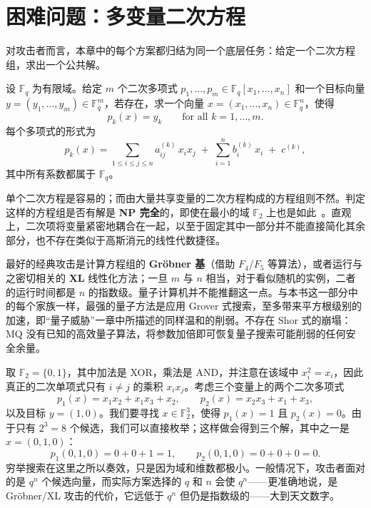 \section{困难问题：多变量二次方程}

对攻击者而言，本章中的每个方案都归结为同一个底层任务：给定一个二次方程组，求出一个公共解。

\begin{definition}[多变量二次（MQ）问题]
设 $\mathbb{F}_q$ 为有限域。给定 $m$ 个二次多项式 $p_1,\dots,p_m \in \mathbb{F}_q[x_1,\dots,x_n]$ 和一个目标向量 $y = (y_1,\dots,y_m) \in \mathbb{F}_q^m$，若存在，求一个向量 $x = (x_1,\dots,x_n) \in \mathbb{F}_q^n$，使得
\[
p_k(x) = y_k \qquad \text{for all } k = 1,\dots,m .
\]
每个多项式的形式为
\[
p_k(x) = \sum_{1 \le i \le j \le n} a^{(k)}_{ij}\, x_i x_j \;+\; \sum_{i=1}^{n} b^{(k)}_i\, x_i \;+\; c^{(k)} ,
\]
其中所有系数都属于 $\mathbb{F}_q$。
\end{definition}

单个二次方程是容易的；而由大量共享变量的二次方程构成的方程组则不然。判定这样的方程组是否有解是 \textbf{NP 完全}的，即使在最小的域 $\mathbb{F}_2$ 上也是如此~\cite{ding2006}。直观上，二次项将变量紧密地耦合在一起，以至于固定其中一部分并不能直接简化其余部分，也不存在类似于高斯消元的线性代数捷径。

最好的经典攻击是计算方程组的 \textbf{Gr\"obner 基}（借助 $F_4$/$F_5$ 等算法），或者运行与之密切相关的 \textbf{XL} 线性化方法；一旦 $m$ 与 $n$ 相当，对于看似随机的实例，二者的运行时间都是 $n$ 的指数级。量子计算机并不能推翻这一点。与本书这一部分中的每个家族一样，最强的量子方法是应用 Grover 式搜索，至多带来平方根级别的加速，即“量子威胁”一章中所描述的同样温和的削弱。不存在 Shor 式的崩塌：MQ 没有已知的高效量子算法，将参数加倍即可恢复量子搜索可能削弱的任何安全余量。

\begin{example}
取 $\mathbb{F}_2 = \{0,1\}$，其中加法是 XOR，乘法是 AND，并注意在该域中 $x_i^2 = x_i$，因此真正的二次单项式只有 $i \neq j$ 的乘积 $x_i x_j$。考虑三个变量上的两个二次多项式
\[
p_1(x) = x_1 x_2 + x_1 x_3 + x_2 , \qquad
p_2(x) = x_2 x_3 + x_1 + x_3 ,
\]
以及目标 $y = (1,0)$。我们要寻找 $x \in \mathbb{F}_2^3$，使得 $p_1(x) = 1$ 且 $p_2(x) = 0$。由于只有 $2^3 = 8$ 个候选，我们可以直接枚举；这样做会得到三个解，其中之一是 $x = (0,1,0)$：
\[
p_1(0,1,0) = 0 + 0 + 1 = 1 , \qquad p_2(0,1,0) = 0 + 0 + 0 = 0 .
\]
穷举搜索在这里之所以奏效，只是因为域和维数都极小。一般情况下，攻击者面对的是 $q^n$ 个候选向量，而实际方案选择的 $q$ 和 $n$ 会使 $q^n$——更准确地说，是 Gr\"obner/XL 攻击的代价，它远低于 $q^n$ 但仍是指数级的——大到天文数字。
\end{example}

